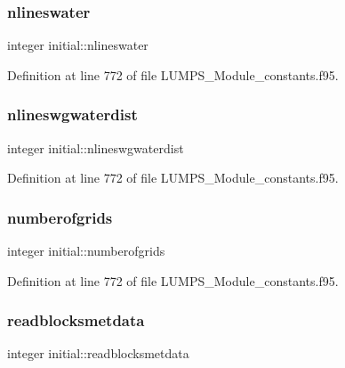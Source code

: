 \mbox{\label{namespaceinitial_aaea90ff1bd06bb3df87ea523480ef5e3}} 
\subsubsection{\texorpdfstring{nlineswater}{nlineswater}}
{\footnotesize\ttfamily integer initial\+::nlineswater}



Definition at line 772 of file L\+U\+M\+P\+S\+\_\+\+Module\+\_\+constants.\+f95.

\mbox{\label{namespaceinitial_aa6972faf65c690ae7dcd1d0273db5e5c}} 
\subsubsection{\texorpdfstring{nlineswgwaterdist}{nlineswgwaterdist}}
{\footnotesize\ttfamily integer initial\+::nlineswgwaterdist}



Definition at line 772 of file L\+U\+M\+P\+S\+\_\+\+Module\+\_\+constants.\+f95.

\mbox{\label{namespaceinitial_a8b597530437378547375fd052f654b6d}} 
\subsubsection{\texorpdfstring{numberofgrids}{numberofgrids}}
{\footnotesize\ttfamily integer initial\+::numberofgrids}



Definition at line 772 of file L\+U\+M\+P\+S\+\_\+\+Module\+\_\+constants.\+f95.

\mbox{\label{namespaceinitial_a54d1c6370c32660f5e42047474ab1aa8}} 
\subsubsection{\texorpdfstring{readblocksmetdata}{readblocksmetdata}}
{\footnotesize\ttfamily integer initial\+::readblocksmetdata}



